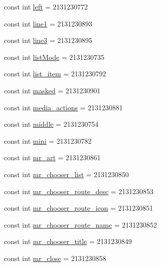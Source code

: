 \begin{CompactItemize}
const int \hyperlink{class__2doo_1_1_droid_1_1_resource_1_1_id_47c7353ca16a7d08b1ec441e148f4809}{left} = 2131230772
\item 
const int \hyperlink{class__2doo_1_1_droid_1_1_resource_1_1_id_b14e4098ff800ec4386b6ed829c61aeb}{line1} = 2131230893
\item 
const int \hyperlink{class__2doo_1_1_droid_1_1_resource_1_1_id_536efc146736a7321401458bd39f35df}{line3} = 2131230895
\item 
const int \hyperlink{class__2doo_1_1_droid_1_1_resource_1_1_id_2ca23032296e40b604e1139e5d493621}{listMode} = 2131230735
\item 
const int \hyperlink{class__2doo_1_1_droid_1_1_resource_1_1_id_120d812f13347b4300f75e91276055df}{list\_\-item} = 2131230792
\item 
const int \hyperlink{class__2doo_1_1_droid_1_1_resource_1_1_id_56d5051cf64324573bc75fe1f0fa7188}{masked} = 2131230901
\item 
const int \hyperlink{class__2doo_1_1_droid_1_1_resource_1_1_id_519bba8243fb800c73aca582c704e8f8}{media\_\-actions} = 2131230881
\item 
const int \hyperlink{class__2doo_1_1_droid_1_1_resource_1_1_id_a592f9c83095817a8a7b9f88dffd3654}{middle} = 2131230754
\item 
const int \hyperlink{class__2doo_1_1_droid_1_1_resource_1_1_id_679f84dd4cb0b08295d83cce3e5c9b90}{mini} = 2131230782
\item 
const int \hyperlink{class__2doo_1_1_droid_1_1_resource_1_1_id_541f56d850fd836e7ef83248bd974554}{mr\_\-art} = 2131230861
\item 
const int \hyperlink{class__2doo_1_1_droid_1_1_resource_1_1_id_e66f3fee5792293944e15fc44b0d804c}{mr\_\-chooser\_\-list} = 2131230850
\item 
const int \hyperlink{class__2doo_1_1_droid_1_1_resource_1_1_id_e87b9f6bddf9edaabd979ac7eaa46728}{mr\_\-chooser\_\-route\_\-desc} = 2131230853
\item 
const int \hyperlink{class__2doo_1_1_droid_1_1_resource_1_1_id_6adccce6feee1e62e04c2011050def5b}{mr\_\-chooser\_\-route\_\-icon} = 2131230851
\item 
const int \hyperlink{class__2doo_1_1_droid_1_1_resource_1_1_id_38fd5d323794ec90b25c7827a15a1ebd}{mr\_\-chooser\_\-route\_\-name} = 2131230852
\item 
const int \hyperlink{class__2doo_1_1_droid_1_1_resource_1_1_id_c1d8de3697aa046a2684746774ae00c4}{mr\_\-chooser\_\-title} = 2131230849
\item 
const int \hyperlink{class__2doo_1_1_droid_1_1_resource_1_1_id_384ead69f0212f25ca41c5ae5d545a7b}{mr\_\-close} = 2131230858

\end{CompactItemize}
